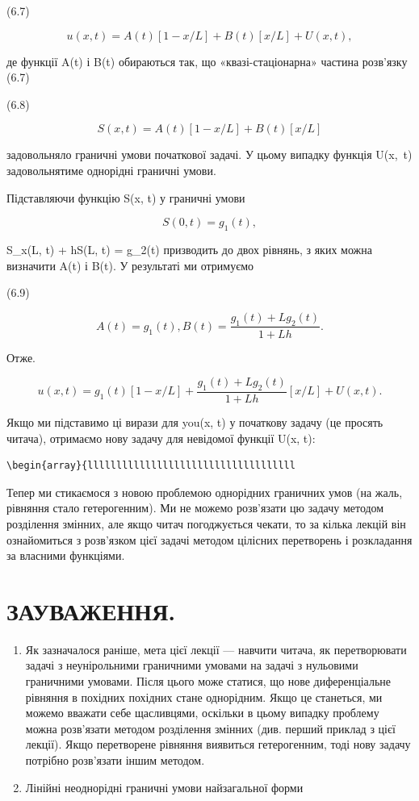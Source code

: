 \documentclass[
  ukrainian,
]{article}
\begin{document}
(6.7)

\[
u(x, t) = A(t)[1-x/L] + B(t)[x/L] + U(x, t),
\]

де функції A\left(t\right) і B\left(t\right) обираються так, що
«квазі-стаціонарна» частина розв'язку (6.7)

(6.8)

\[
S(x, t) = A(t)[1 - x/L] + B(t)[x/L]
\]

задовольняло граничні умови початкової задачі. У цьому випадку функція
U\left(x,~t\right) задовольнятиме однорідні граничні умови.

Підставляючи функцію S(x, t) у граничні умови

\[
S(0, t) = g_1(t),
\]

S\_x(L, t) + hS(L, t) = g\_2(t) призводить до двох рівнянь, з яких можна
визначити A(t) і B(t). У результаті ми отримуємо

(6.9)

\[
A(t) = g_1(t), B(t) = \frac{g_1(t) + Lg_2(t)}{1 + Lh}.
\]

Отже.

\[
u(x, t) = g_1(t) [1 - x/L] + \frac{g_1(t) + Lg_2(t)}{1 + Lh} [x/L] + U(x, t).
\]

Якщо ми підставимо ці вирази для you(x, t) у початкову задачу (це
просять читача), отримаємо нову задачу для невідомої функції U(x, t):

\begin{verbatim}
\begin{array}{llllllllllllllllllllllllllllllllllll
\end{verbatim}

Тепер ми стикаємося з новою проблемою однорідних граничних умов (на
жаль, рівняння стало гетерогенним). Ми не можемо розв'язати цю задачу
методом розділення змінних, але якщо читач погоджується чекати, то за
кілька лекцій він ознайомиться з розв'язком цієї задачі методом цілісних
перетворень і розкладання за власними функціями.

\section{ЗАУВАЖЕННЯ.}\label{ux437ux430ux443ux432ux430ux436ux435ux43dux43dux44f.}

\begin{enumerate}
\def\labelenumi{\arabic{enumi}.}
\item
  Як зазначалося раніше, мета цієї лекції --- навчити читача, як
  перетворювати задачі з неунірольними граничними умовами на задачі з
  нульовими граничними умовами. Після цього може статися, що нове
  диференціальне рівняння в похідних похідних стане однорідним. Якщо це
  станеться, ми можемо вважати себе щасливцями, оскільки в цьому випадку
  проблему можна розв'язати методом розділення змінних (див. перший
  приклад з цієї лекції). Якщо перетворене рівняння виявиться
  гетерогенним, тоді нову задачу потрібно розв'язати іншим методом.
\item
  Лінійні неоднорідні граничні умови найзагальної форми
\end{enumerate}
\end{document}
